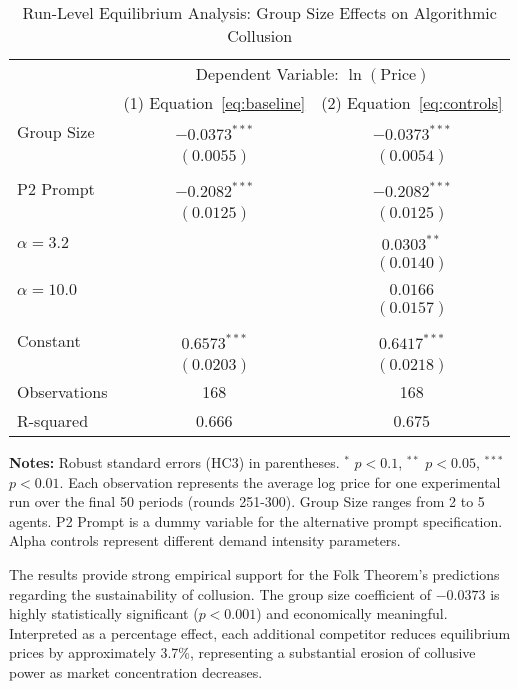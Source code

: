 \begin{table}[htbp!]
    \centering
    \caption{Run-Level Equilibrium Analysis: Group Size Effects on Algorithmic Collusion}
    \label{tab:run_level_results}
    \begin{threeparttable}
    \begin{tabular}{lcc}
    \toprule
     & \multicolumn{2}{c}{Dependent Variable: $\ln(\text{Price})$} \\
    \cmidrule(lr){2-3}
     & (1) Equation~\eqref{eq:baseline} & (2) Equation~\eqref{eq:controls} \\
    \midrule
    Group Size & $-0.0373^{***}$ & $-0.0373^{***}$ \\
     & $(0.0055)$ & $(0.0054)$ \\
    \\
    P2 Prompt & $-0.2082^{***}$ & $-0.2082^{***}$ \\
     & $(0.0125)$ & $(0.0125)$ \\
    \\
    $\alpha = 3.2$ &  & $0.0303^{**}$ \\
     &  & $(0.0140)$ \\
    \\
    $\alpha = 10.0$ &  & $0.0166$ \\
     &  & $(0.0157)$ \\
    \\
    Constant & $0.6573^{***}$ & $0.6417^{***}$ \\
     & $(0.0203)$ & $(0.0218)$ \\
    \midrule
    Observations & 168 & 168 \\
    R-squared & 0.666 & 0.675 \\
    \bottomrule
    \end{tabular}
    \begin{tablenotes}[flushleft]
    \footnotesize
    \item \textbf{Notes:} Robust standard errors (HC3) in parentheses. $^{*}$ $p<0.1$, $^{**}$ $p<0.05$, $^{***}$ $p<0.01$. Each observation represents the average log price for one experimental run over the final 50 periods (rounds 251-300). Group Size ranges from 2 to 5 agents. P2 Prompt is a dummy variable for the alternative prompt specification. Alpha controls represent different demand intensity parameters.
    \end{tablenotes}
    \end{threeparttable}
\end{table}

The results provide strong empirical support for the Folk Theorem's predictions regarding the sustainability of collusion. The group size coefficient of $-0.0373$ is highly statistically significant ($p < 0.001$) and economically meaningful. Interpreted as a percentage effect, each additional competitor reduces equilibrium prices by approximately 3.7\%, representing a substantial erosion of collusive power as market concentration decreases.

